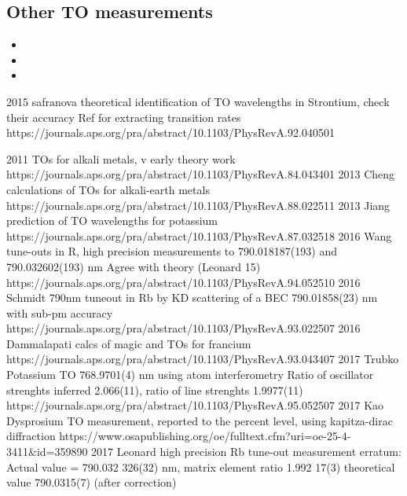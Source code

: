 \subsection{Other TO measurements}
	\begin{itemize}
	\item {}
	\item {}
	\item{}
	\end{itemize}
	2015 safranova theoretical identification of TO wavelengths in Strontium, check their accuracy
		Ref for extracting transition rates
		https://journals.aps.org/pra/abstract/10.1103/PhysRevA.92.040501

	2011 TOs for alkali metals, v early theory work
		https://journals.aps.org/pra/abstract/10.1103/PhysRevA.84.043401
	2013 Cheng calculations of TOs for alkali-earth metals
		https://journals.aps.org/pra/abstract/10.1103/PhysRevA.88.022511
	2013 Jiang prediction of TO wavelengths for potassium
		https://journals.aps.org/pra/abstract/10.1103/PhysRevA.87.032518
	2016 Wang tune-outs in R, high precision measurements to 790.018187(193) and 790.032602(193) nm
		Agree with theory (Leonard 15)
		https://journals.aps.org/pra/abstract/10.1103/PhysRevA.94.052510
	2016 Schmidt 790nm tuneout in Rb by KD scattering of a BEC
		790.01858(23) nm with sub-pm accuracy
		https://journals.aps.org/pra/abstract/10.1103/PhysRevA.93.022507
	2016 Dammalapati calcs of magic and TOs for francium
		https://journals.aps.org/pra/abstract/10.1103/PhysRevA.93.043407
	2017 Trubko Potassium TO 768.9701(4) nm using atom interferometry
		 Ratio of oscillator strenghts inferred 2.066(11), ratio of line strenghts 1.9977(11)
		https://journals.aps.org/pra/abstract/10.1103/PhysRevA.95.052507
	2017 Kao Dysprosium TO measurement, reported to the percent level, using kapitza-dirac diffraction
		https://www.osapublishing.org/oe/fulltext.cfm?uri=oe-25-4-3411&id=359890 
	2017 Leonard high precision Rb tune-out measurement
		erratum: Actual value = 790.032 326(32) nm, matrix element ratio 1.992 17(3)
		theoretical value 790.0315(7) (after correction)

